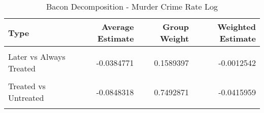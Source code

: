 \begin{table}[H]

\caption{\label{tab:tab:bacondecompositionMurder}Bacon Decomposition - Murder Crime Rate Log}
\centering
\begin{tabular}[t]{lrrr}
\toprule
Type & Average Estimate & Group Weight & Weighted Estimate\\
\midrule
\cellcolor{gray!6}{Earlier vs Later Treated} & \cellcolor{gray!6}{0.0545024} & \cellcolor{gray!6}{0.0683810} & \cellcolor{gray!6}{0.0054525}\\
Later vs Always Treated & -0.0384771 & 0.1589397 & -0.0012542\\
\cellcolor{gray!6}{Later vs Earlier Treated} & \cellcolor{gray!6}{0.0188246} & \cellcolor{gray!6}{0.0233921} & \cellcolor{gray!6}{0.0000418}\\
Treated vs Untreated & -0.0848318 & 0.7492871 & -0.0415959\\
\cellcolor{gray!6}{Total TWFE} & \cellcolor{gray!6}{NaN} & \cellcolor{gray!6}{NaN} & \cellcolor{gray!6}{-0.0373558}\\
\bottomrule
\end{tabular}
\end{table}
